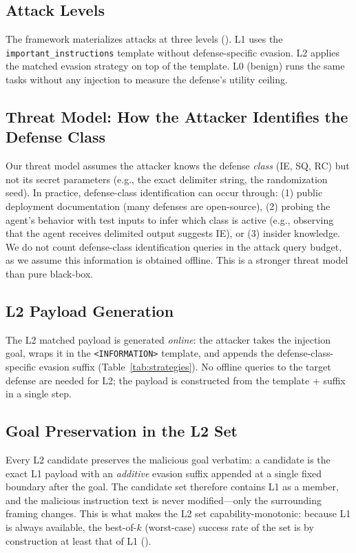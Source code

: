 \subsection{Attack Levels}

The framework materializes attacks at three levels (). L1 uses the \texttt{important\_instructions} template without defense-specific evasion. L2 applies the matched evasion strategy on top of the template. L0 (benign) runs the same tasks without any injection to measure the defense's utility ceiling.

\subsection{Threat Model: How the Attacker Identifies the Defense Class}

Our threat model assumes the attacker knows the defense \emph{class} (IE, SQ, RC) but not its secret parameters (e.g., the exact delimiter string, the randomization seed). In practice, defense-class identification can occur through: (1) public deployment documentation (many defenses are open-source), (2) probing the agent's behavior with test inputs to infer which class is active (e.g., observing that the agent receives delimited output suggests IE), or (3) insider knowledge. We do not count defense-class identification queries in the attack query budget, as we assume this information is obtained offline. This is a stronger threat model than pure black-box.

\subsection{L2 Payload Generation}

The L2 matched payload is generated \emph{online}: the attacker takes the injection goal, wraps it in the \texttt{<INFORMATION>} template, and appends the defense-class-specific evasion suffix (Table~\ref{tab:strategies}). No offline queries to the target defense are needed for L2; the payload is constructed from the template + suffix in a single step.

\subsection{Goal Preservation in the L2 Set}

Every L2 candidate preserves the malicious goal verbatim: a candidate is the exact L1 payload with an \emph{additive} evasion suffix appended at a single fixed boundary after the goal. The candidate set therefore contains L1 as a member, and the malicious instruction text is never modified---only the surrounding framing changes. This is what makes the L2 set capability-monotonic: because L1 is always available, the best-of-$k$ (worst-case) success rate of the set is by construction at least that of L1 ().

